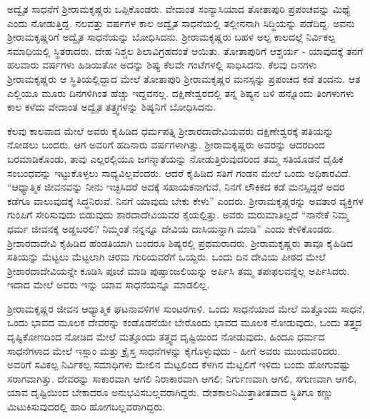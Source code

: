ಅದ್ವೈತ ಸಾಧನೆಗೆ ಶ‍್ರೀರಾಮಕೃಷ್ಣರು ಒಪ್ಪಿಕೊಂಡರು. ವೇದಾಂತ ಸಂನ್ಯಾಸಿಯಾದ ತೋತಾಪುರಿ ಪ್ರಪಂಚವನ್ನು ಮಿಥ್ಯೆ ಎಂದು ನೋಡುತ್ತಿದ್ದ. ನಲವತ್ತು ವರ್ಷಗಳ ಕಾಲ ಅದ್ವೈತ ಸಾಧನೆಯಲ್ಲಿ ತಲ್ಲೀನನಾಗಿ ಸಿದ್ಧಿಯನ್ನು ಪಡೆದಿದ್ದ. ಅವನು ಶ‍್ರೀರಾಮಕೃಷ್ಣರಿಗೆ ಅದ್ವೈತ ಸಾಧನೆಯನ್ನು ಬೋಧಿಸಿದನು. ಶ‍್ರೀರಾಮಕೃಷ್ಣರು ಬಹಳ ಅಲ್ಪ ಕಾಲದಲ್ಲೆ ನಿರ್ವಿಕಲ್ಪ ಸಮಾಧಿಯಲ್ಲಿ ಸ್ಥಿತರಾದರು. ದೇಹ ನಿಶ್ಚಲ ಶಿಲಾವಿಗ್ರಹದಂತೆ ಆಯಿತು. ತೋತಾಪುರಿಗೆ ಆಶ್ಚರ್ಯ - ಯಾವುದಕ್ಕೆ ತನಗೆ ಹಲವಾರು ವರ್ಷಗಳು ಹಿಡಿಯಿತೋ ಅದನ್ನು ಶಿಷ್ಯ ಕೆಲವೇ ಗಂಟೆಗಳಲ್ಲಿ ಸಾಧಿಸಿದನು. ಕೆಲವು ದಿನಗಳು ಶ‍್ರೀರಾಮಕೃಷ್ಣರು ಆ ಸ್ಥಿತಿಯಲ್ಲಿದ್ದಾದ ಮೇಲೆ ತೋತಾಪುರಿ ಶ‍್ರೀರಾಮಕೃಷ್ಣರ ಮನಸ್ಸನ್ನು ಪ್ರಪಂಚದ ಕಡೆ ತಂದನು. ಆತ ಎಲ್ಲಿಯೂ ಮೂರು ದಿನಗಳಿಗಿಂತ ಹೆಚ್ಚು ಇದ್ದವನಲ್ಲ. ದಕ್ಷಿಣೇಶ್ವರದಲ್ಲಿ ತನ್ನ ಶಿಷ್ಯನ ಬಳಿ ಹನ್ನೊಂದು ತಿಂಗಳುಗಳು ಕಾಲ ಕಳೆದು ವೇದಾಂತ ಅದ್ವೈತ ತತ್ತ್ವಗಳನ್ನು ಶಿಷ್ಯನಿಗೆ ಬೋಧಿಸಿದನು.

ಕೆಲವು ಕಾಲವಾದ ಮೇಲೆ ಅವರು ಕೈಹಿಡಿದ ಧರ್ಮಪತ್ನಿ ಶ‍್ರೀಶಾರದಾದೇವಿ\-ಯವರು ದಕ್ಷಿಣೇಶ್ವರಕ್ಕೆ ಪತಿಯನ್ನು ನೋಡಲು ಬಂದರು. ಆಗ ಅವರಿಗೆ ಹದಿನಾರು ವರ್ಷಗಳಾಗಿತ್ತು. ಶ‍್ರೀರಾಮಕೃಷ್ಣರು ಅವರನ್ನು ಆದರದಿಂದ ಬರಮಾಡಿಕೊಂಡು, ತಾವು ಎಲ್ಲರಲ್ಲಿಯೂ ಜಗನ್ಮಾತೆಯನ್ನು ನೋಡುತ್ತಿರುವುದರಿಂದ ತಮ್ಮ ಸತಿಯೊಡನೆ ದೈಹಿಕ ಸಂಬಂಧವನ್ನು ಇಟ್ಟುಕೊಳ್ಳಲು ಸಾಧ್ಯವಿಲ್ಲವೆಂದರು. ಆದರೆ ಕೈಹಿಡಿದ ಸತಿಗೆ ಗಂಡನ ಮೇಲೆ ಒಂದು ಅಧಿಕಾರವಿದೆ. “ಆಧ್ಯಾತ್ಮಿಕ ಜೀವನವನ್ನು ನೀನು ಇಚ್ಛಿಸಿದರೆ ಅದಕ್ಕೆ ಸಹಾಯಕನಾಗುವೆ, ನಿನಗೆ ಲೌಕಿಕದ ಕಡೆ ಮನಸ್ಸಿದ್ದರೆ ಅದರ ಕಡೆಗೂ ವಾಲುವುದಕ್ಕೆ ಸಿದ್ಧನಿರುವೆ. ನಿನಗೆ ಯಾವುದು ಬೇಕು ಕೇಳು” ಎಂದರು. ಶ‍್ರೀರಾಮಕೃಷ್ಣರನ್ನು ಅವತಾರ ವ್ಯಕ್ತಿಗಳ ಗುಂಪಿಗೆ ಸೇರಿಸುವುದು ಬಿಡುವುದು ಶಾರದಾದೇವಿಯವರ ಕೈಯಲ್ಲಿತ್ತು. ಅವರು ಮರುಮಾತಿಲ್ಲದೆ “ನಾನೇಕೆ ನಿಮ್ಮ ಧರ್ಮ ಜೀವನಕ್ಕೆ ಅಡ್ಡಬರಲಿ? ನಿಮ್ಮಂತೆ ನನ್ನನ್ನೂ ದೇವಿಯ ದಾಸಿಯನ್ನಾಗಿ ಮಾಡಿ” ಎಂದು ಕೇಳಿಕೊಂಡರು. ಶ‍್ರೀಶಾರದಾದೇವಿ ಕೈಹಿಡಿದ ಹೆಂಡತಿಯಾಗಿ ಬಂದರೂ ಶಿಷ್ಯರಲ್ಲಿ ಪ್ರಥಮರಾದರು. ಶ‍್ರೀರಾಮಕೃಷ್ಣರು ತಾವೂ ಕೈಹಿಡಿದ ಸತಿಯನ್ನು ಮೆಟ್ಟಲು ಮೆಟ್ಟಲಾಗಿ ಚರಮ ಗುರಿಯವರೆಗೆ ಒಯ್ದರು. ಒಂದು ದಿನ ದೇವಿಯ ಪೀಠದ ಮೇಲೆ ಶ‍್ರೀಶಾರದಾದೇವಿಯನ್ನೇ ಕೂಡಿಸಿ ಪೂಜೆ ಮಾಡಿ ಪುಷ್ಪಾಂಜಲಿಯನ್ನು ಅರ್ಪಿಸಿ ತಮ್ಮ ತಪಃಫಲವನ್ನೆಲ್ಲ ಅರ್ಪಿಸಿದರು. ಇದಾದ ಮೇಲೆ ಅವರು ಇನ್ನು ಯಾವ ಸಾಧನೆಯನ್ನೂ ಮಾಡಲಿಲ್ಲ.

ಶ‍್ರೀರಾಮಕೃಷ್ಣರ ಜೀವನ ಆಧ್ಯಾತ್ಮಿಕ ಘಟನಾವಳಿಗಳ ಸುಂಟರಗಾಳಿ. ಒಂದು ಸಾಧನೆಯಾದ ಮೇಲೆ ಮತ್ತೊಂದು ಸಾಧನೆ, ಒಂದು ಭಾವದ ಮೂಲಕ ದೇವರನ್ನು ಕಂಡೊಡನೆಯೇ ಬೇರೊಂದು ಭಾವದ ಮೂಲಕ ನೋಡುವುದು, ಒಂದು ತತ್ತ್ವದ ದೃಷ್ಟಿಕೋಣದಿಂದ ನೋಡಿದ ಮೇಲೆ ಮತ್ತೊಂದು ತತ್ತ್ವದ ದೃಷ್ಟಿಯಿಂದ ನೋಡುವುದು, ಹಿಂದೂ ಧರ್ಮದ ಸಾಧನೆಗಳಾದ ಮೇಲೆ ಇಸ್ಲಾಂ ಮತ್ತು ಕ್ರೈಸ್ತ ಸಾಧನೆಗಳನ್ನು ಕೈಗೊಳ್ಳುವುದು - ಹೀಗೆ ಅವರು ಮುಂದುವರಿದರು. ಅವರಿಗೆ ಸವಿಕಲ್ಪ ನಿರ್ವಿಕಲ್ಪ ಸಮಾಧಿಗಳು ಮೇಲಿನ ಮೆಟ್ಟಲಿಂದ ಕೆಳಗಿನ ಮೆಟ್ಟಲಿಗೆ ಇಳಿದು ಬಂದು ಹೋಗುವಷ್ಟು ಸರಾಗವಾಗಿತ್ತು. ದೇವರನ್ನು ಸಾಕಾರವಾಗಿ ಆಗಲಿ ನಿರಾಕಾರವಾಗಿ ಆಗಲಿ; ನಿರ್ಗುಣವಾಗಿ ಆಗಲಿ, ಸಗುಣವಾಗಿ ಆಗಲಿ, ಯಾವ ದೃಷ್ಟಿಯಿಂದ ಬೇಕಾದರೂ ಅನುಭವಿಸಬಲ್ಲವರಾಗಿದ್ದರು. ದೇಶಕಾಲನಿಮಿತ್ತಾತೀತವಾದ ಸ್ಥಿತಿಗೂ ಕಣ್ಣು ಮಿಟುಕಿಸುವುದರಲ್ಲಿ ಹಾರಿ ಹೋಗಬಲ್ಲವರಾಗಿದ್ದರು.

